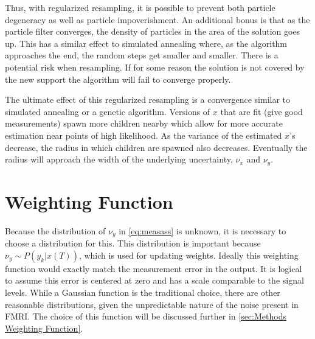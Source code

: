 Thus, with regularized resampling, it is possible to prevent both
particle degeneracy as well as particle impoverishment. An additional
bonus is that as the particle filter converges, the density of particles
in the area of the solution goes up. This has a similar effect to 
simulated annealing where, as the algorithm approaches the end, the
random steps get smaller and smaller. There is a potential risk when
resampling. If for some reason the solution is not covered by the 
new support the algorithm will fail to converge properly.

The ultimate effect of this regularized resampling is a convergence similar to simulated annealing
or a genetic algorithm. Versions of $x$ that are fit (give good measurements) spawn more children 
nearby which allow for more accurate estimation near points of high likelihood. 
As the variance of the estimated
$x$'s decrease, the radius in which children are spawned also decreases. Eventually the radius
will approach the width of the underlying uncertainty, $\nu_x$ and $\nu_y$.

\section{Weighting Function}
Because the distribution of $\nu_y$ in \autoref{eq:measass} is unknown,
it is necessary to choose a distribution for this. This distribution
is important because $\nu_y \sim P(y_k | x(T))$, which is used
for updating weights. Ideally this weighting function would exactly 
match the measurement error in
the output. It is logical to assume this error is centered at zero and 
has a scale comparable to the signal levels.
While a Gaussian function is the traditional choice, there are other reasonable
distributions, given the unpredictable nature of the noise present in FMRI.
The choice of this function will be discussed further in \autoref{sec:Methods Weighting Function}.

